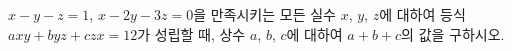 $x-y-z=1$, $x-2y-3z=0$을 만족시키는 모든 실수 $x$, $y$, $z$에 대하여 등식 $axy+byz+czx=12$가 성립할 때, 상수 $a$, $b$, $c$에 대하여 $a+b+c$의 값을 구하시오.
